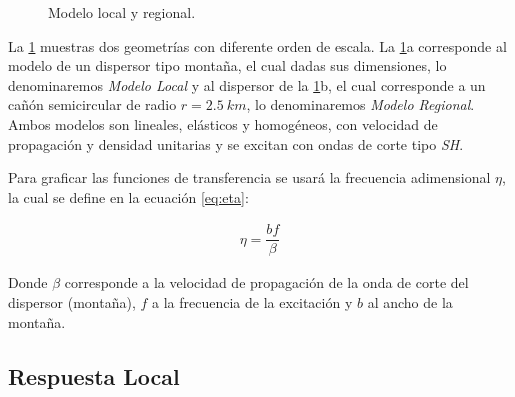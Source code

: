 \documentclass[spanish,letterpaper,12pt,twoside,openany]{article}
\begin{document}
\begin{figure}[H]
	\centering
	\vspace{-.5 cm}
    \caption{Modelo local y regional.}
    \label{fig:modellocalregional}
    \vspace{-1 cm}
\end{figure}

La \cref{fig:modellocalregional} muestras dos geometrías con diferente orden de escala. La \cref{fig:modellocalregional}a corresponde al modelo de un dispersor tipo montaña, el cual dadas sus dimensiones, lo denominaremos \textit{Modelo Local} y al dispersor de la \cref{fig:modellocalregional}b, el cual corresponde a un cañón semicircular de radio $r=2.5\ km$, lo denominaremos \textit{Modelo Regional}. Ambos modelos son lineales, elásticos y homogéneos, con velocidad de propagación y densidad unitarias y se excitan con ondas de corte tipo \textit{SH}.

Para graficar las funciones de transferencia se usará la frecuencia adimensional $\eta$, la cual se define en la ecuación \cref{eq:eta}:

\begin{large}
	\begin{align}\label{eq:eta}
		\eta = \dfrac{b f}{\beta}
	\end{align}
\end{large}

Donde $\beta$ corresponde a la velocidad de propagación de la onda de corte del dispersor (montaña), $f$ a la frecuencia de la excitación y $b$ al ancho de la montaña.

\subsection{Respuesta Local}
\end{document}

